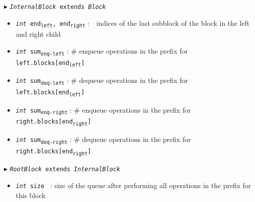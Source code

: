 \documentclass[10pt]{article}
\newcommand{\sub}[1]{\textsubscript{#1}}
\renewcommand{\tt}[1]{\texttt{#1}}
\renewcommand{\sl}[1]{\textsl{#1}}
\newcommand{\size}{size }
\theoremstyle{definition}
\begin{document}
\begin{algorithm}
\begin{algorithmic}[1]
\begin{multicols}{2}
\begin{itemize}
\end{itemize}

\pagebreak

\Statex $\blacktriangleright$ \tt{\sl{InternalBlock} extends \sl{Block}}
\begin{itemize}
    \item \tt{\sl{int} end\sub{left}, end\sub{right}}
  \textsf{:~~indices of the last subblock of the block in the left and right child}
  \item \tt{\sl{int} sum\sub{enq-left}}
  \textsf{: \# enqueue operations in the prefix for \tt{left.blocks[end\sub{left}]}}
  \item \tt{\sl{int} sum\sub{deq-left}}
  \textsf{: \# dequeue operations in the prefix for \tt{left.blocks[end\sub{left}]}}
  \item \tt{\sl{int} sum\sub{enq-right}}
  \textsf{: \# enqueue operations in the prefix for \tt{right.blocks[end\sub{right}]}}
  \item \tt{\sl{int} sum\sub{deq-right}}
  \textsf{: \# dequeue operations in the prefix for \tt{right.blocks[end\sub{right}]}}
\end{itemize}


\Statex $\blacktriangleright$ \tt{\sl{RootBlock} extends \sl{InternalBlock}}
\begin{itemize}
  \item \tt{\sl{int} \size}
  \textsf{: size of the queue after performing all operations in the prefix for this block}
\end{itemize}



\end{multicols}
\end{algorithmic}
\end{algorithm}
\end{document}
